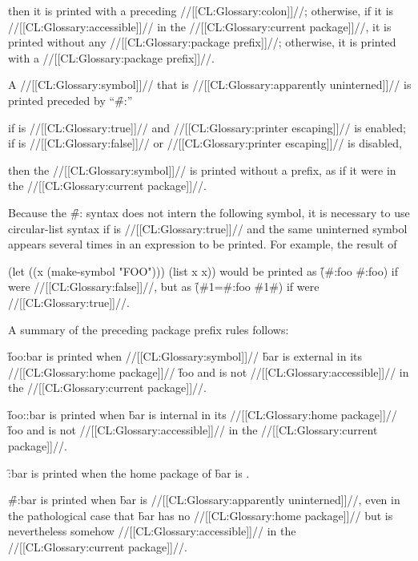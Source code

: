then it is printed with a preceding //[[CL:Glossary:colon]]//; otherwise, if it is //[[CL:Glossary:accessible]]// in the //[[CL:Glossary:current package]]//, it is printed without any //[[CL:Glossary:package prefix]]//; otherwise, it is printed with a //[[CL:Glossary:package prefix]]//.

A //[[CL:Glossary:symbol]]// that is //[[CL:Glossary:apparently uninterned]]// is printed preceded by ``\f{\#:}''  

if  is //[[CL:Glossary:true]]// and //[[CL:Glossary:printer escaping]]// is enabled; if  is //[[CL:Glossary:false]]// or //[[CL:Glossary:printer escaping]]// is disabled,

then the //[[CL:Glossary:symbol]]// is printed without a prefix, as if it were in the //[[CL:Glossary:current package]]//.

Because the \f{\#:} syntax does not intern the following symbol, it is necessary to use circular-list syntax if  is //[[CL:Glossary:true]]// and the same uninterned symbol appears several times in an expression to be printed.  For example, the result of

\code
 (let ((x (make-symbol "FOO"))) (list x x)) \endcode would be printed as \f{(\#:foo \#:foo)} if  were //[[CL:Glossary:false]]//, but as \f{(\#1=\#:foo \#1\#)} if  were //[[CL:Glossary:true]]//.

A summary of the preceding package prefix rules follows:

\beginlist {}

\f{foo:bar} is printed when //[[CL:Glossary:symbol]]// \f{bar}  is external in its //[[CL:Glossary:home package]]// \f{foo}  and is not //[[CL:Glossary:accessible]]// in the //[[CL:Glossary:current package]]//.

\f{foo::bar} is printed when \f{bar} is internal in its //[[CL:Glossary:home package]]// \f{foo} and is not //[[CL:Glossary:accessible]]// in the //[[CL:Glossary:current package]]//.

\f{:bar} is printed when the home package of \f{bar} is .

\f{\#:bar} is printed when \f{bar} is //[[CL:Glossary:apparently uninterned]]//, even in the pathological case that \f{bar}  has no //[[CL:Glossary:home package]]// but is nevertheless somehow //[[CL:Glossary:accessible]]//  in the //[[CL:Glossary:current package]]//. \endlist

